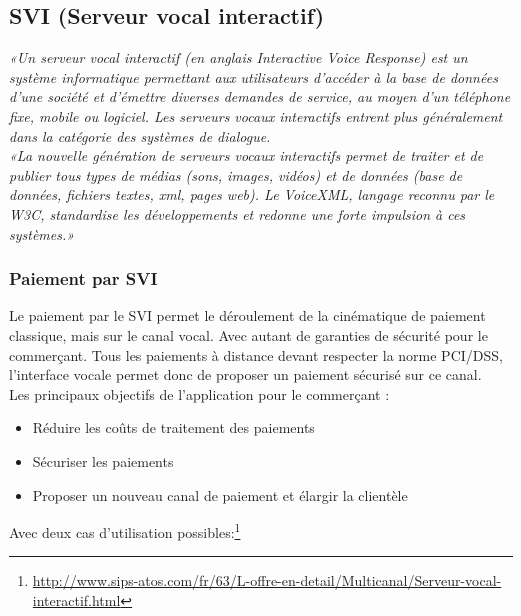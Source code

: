 
\newpage
\subsection{SVI (Serveur vocal interactif)}

\textit{
«Un serveur vocal interactif (en anglais Interactive Voice Response) est un système informatique permettant aux utilisateurs d'accéder à la base de données d'une société et d'émettre diverses demandes de service, au moyen d'un téléphone fixe, mobile ou logiciel. Les serveurs vocaux interactifs entrent plus généralement dans la catégorie des systèmes de dialogue.}\\

\textit{«La nouvelle génération de serveurs vocaux interactifs permet de traiter et de publier tous types de médias (sons, images, vidéos) et de données (base de données, fichiers textes, xml, pages web). Le VoiceXML, langage reconnu par le W3C, standardise les développements et redonne une forte impulsion à ces systèmes.»}\\ 


\subsubsection{Paiement par SVI}
Le paiement par le SVI permet le déroulement de la cinématique de paiement classique, mais sur le canal vocal. Avec autant de garanties de sécurité pour le commerçant. Tous les paiements à distance devant respecter la norme PCI/DSS, l’interface vocale permet donc de proposer un paiement sécurisé sur ce canal.\\

Les principaux objectifs de l’application pour le commerçant :
\begin{itemize}
\item Réduire les coûts de traitement des paiements
\item Sécuriser les paiements
\item Proposer un nouveau canal de paiement et élargir la clientèle\\
\end{itemize}

Avec deux cas d’utilisation possibles:\footnote{\url{http://www.sips-atos.com/fr/63/L-offre-en-detail/Multicanal/Serveur-vocal-interactif.html}} 

